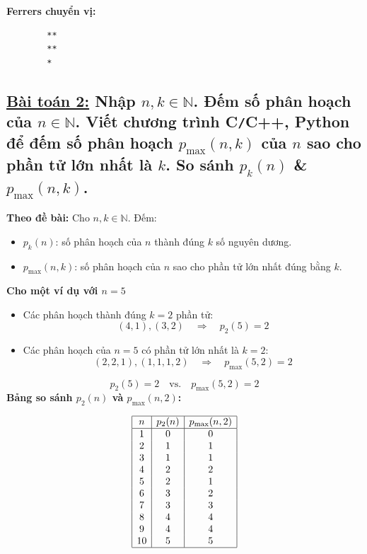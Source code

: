 \documentclass{article}
\begin{document}
	\textbf{Ferrers chuyển vị:}
	\begin{Verbatim}
		**
		**
		*
	\end{Verbatim}
	
	\subsection*{\underline{Bài toán 2:} Nhập $n,k\in\mathbb{N}$. Đếm số phân hoạch của $n\in\mathbb{N}$. Viết chương trình {\sf C{\tt/}C++, Python} để đếm số phân hoạch $p_{\max}(n,k)$ của $n$ sao cho phần tử lớn nhất là $k$. So sánh $p_k(n)$ \& $p_{\max}(n,k)$.
	}
	
	\textbf{Theo đề bài:} Cho $n, k \in \mathbb{N}$. Đếm:
	\begin{itemize}
		\item $p_k(n)$: số phân hoạch của $n$ thành đúng $k$ số nguyên dương.
		\item $p_{\max}(n, k)$: số phân hoạch của $n$ sao cho phần tử lớn nhất đúng bằng $k$.
	\end{itemize}
	
	\textbf{Cho một ví dụ với $n=5$}
	
	\begin{itemize}
		\item Các phân hoạch thành đúng $k=2$ phần tử:
		\[
		(4,1), (3,2)
		\quad\Rightarrow\quad p_2(5) = 2
		\]
		\item Các phân hoạch của $n=5$ có phần tử lớn nhất là $k=2$:
		\[
		(2,2,1), (1,1,1,2)
		\quad\Rightarrow\quad p_{\max}(5,2) = 2
		\]
	\end{itemize}
	
	\[
	p_2(5) = 2 \quad\text{vs.}\quad p_{\max}(5,2) = 2
	\]
	\newpage
	\textbf{Bảng so sánh \( p_2(n) \) và \( p_{\max}(n, 2) \):}
	
	\[
	\begin{array}{|c|c|c|}
		\hline
		n & p_2(n) & p_{\max}(n, 2) \\
		\hline
		1 & 0 & 0 \\
		2 & 1 & 1 \\
		3 & 1 & 1 \\
		4 & 2 & 2 \\
		5 & 2 & 1 \\
		6 & 3 & 2 \\
		7 & 3 & 3 \\
		8 & 4 & 4 \\
		9 & 4 & 4 \\
		10 & 5 & 5 \\
		\hline
	\end{array}
	\]
	
\end{document}

